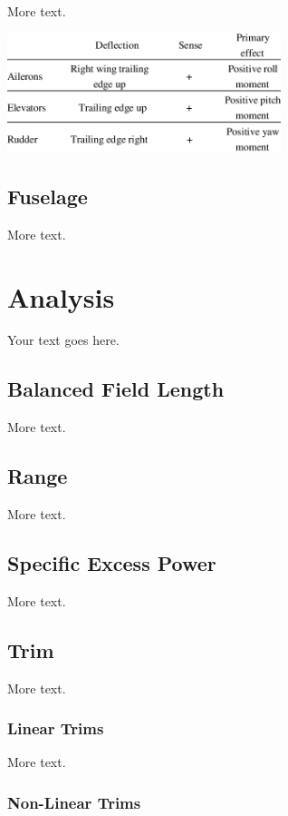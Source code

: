 \documentclass[11pt]{article} %
\begin{document}
More text.
\begin{center}
    \includegraphics[width=0.6\textwidth]{cs_sign_conventions}
\end{center}

\subsection{Fuselage}

More text.

\section{Analysis}

Your text goes here.

\subsection{Balanced Field Length}

More text.

\subsection{Range}

More text.

\subsection{Specific Excess Power}

More text.

\subsection{Trim}

More text.

\subsubsection{Linear Trims}

More text.

\subsubsection{Non-Linear Trims}
\end{document}
